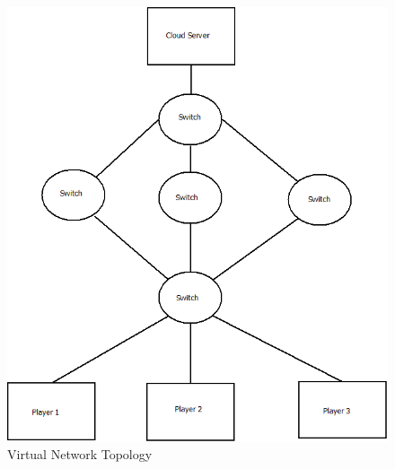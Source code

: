 \begin{figure}[h!]
 \centering
 \includegraphics[width=\linewidth]{images/network.png}
 \caption{Virtual Network Topology}
 \label{fig:network}
\end{figure}


